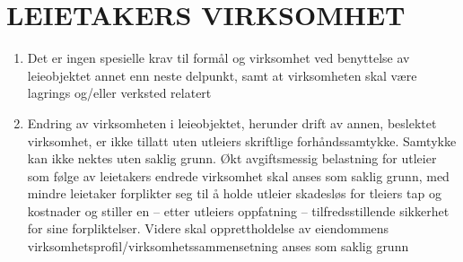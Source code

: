 \section{LEIETAKERS VIRKSOMHET}


	\begin{enumerate}


		\item Det er ingen spesielle krav til formål og virksomhet ved benyttelse av leieobjektet annet enn neste delpunkt, samt at virksomheten skal være lagrings og/eller verksted relatert

		\item Endring av virksomheten i leieobjektet, herunder drift av annen, beslektet virksomhet, er ikke tillatt uten utleiers skriftlige forhåndssamtykke. Samtykke kan ikke nektes uten saklig grunn. Økt avgiftsmessig belastning for utleier som følge av leietakers
		endrede virksomhet skal anses som saklig grunn, med mindre leietaker forplikter seg til å holde utleier skadesløs for tleiers tap
		og kostnader og stiller en – etter utleiers oppfatning – tilfredsstillende sikkerhet for sine forpliktelser. Videre skal opprettholdelse
		av eiendommens virksomhetsprofil/virksomhetssammensetning anses som saklig grunn


	\end{enumerate}
